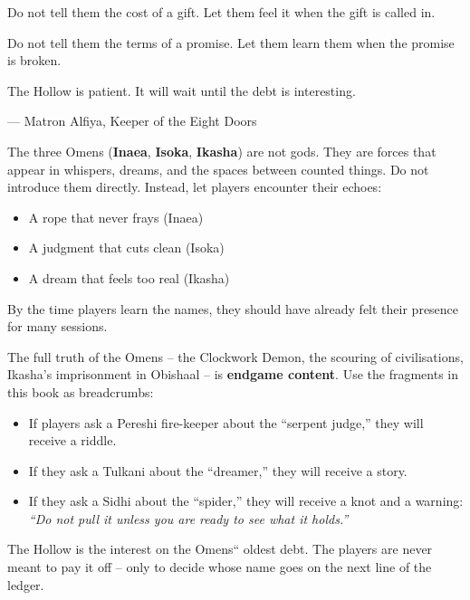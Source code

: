 \documentclass[11pt,letterpaper,twoside]{book}
\begin{document}
Do not tell them the cost of a gift. Let them feel it when the gift is called in.

Do not tell them the terms of a promise. Let them learn them when the promise is broken.

The Hollow is patient. It will wait until the debt is interesting.

\vspace{1em}
\hfill --- Matron Alfiya, Keeper of the Eight Doors
\newpage

\begin{tcolorbox}[colback=black!2,colframe=blue!60!black,title={For the GM -- The Spider, the Snake, the Raven},breakable]
  The three Omens (\textbf{Inaea}, \textbf{Isoka}, \textbf{Ikasha}) are not gods. They are forces that appear in whispers, dreams, and the spaces between counted things. Do not introduce them directly. Instead, let players encounter their echoes:
  \begin{itemize}
    \item A rope that never frays (Inaea)
    \item A judgment that cuts clean (Isoka)
    \item A dream that feels too real (Ikasha)
  \end{itemize}
  By the time players learn the names, they should have already felt their presence for many sessions.

  The full truth of the Omens -- the Clockwork Demon, the scouring of civilisations, Ikasha's imprisonment in Obishaal -- is \textbf{endgame content}. Use the fragments in this book as breadcrumbs:
  \begin{itemize}
    \item If players ask a Pereshi fire-keeper about the ``serpent judge,'' they will receive a riddle.
    \item If they ask a Tulkani about the ``dreamer,'' they will receive a story.
    \item If they ask a Sidhi about the ``spider,'' they will receive a knot and a warning: \textit{``Do not pull it unless you are ready to see what it holds.''}
  \end{itemize}
  The Hollow is the interest on the Omens`` oldest debt. The players are never meant to pay it off -- only to decide whose name goes on the next line of the ledger.
\end{tcolorbox}
\newpage


\end{document}
